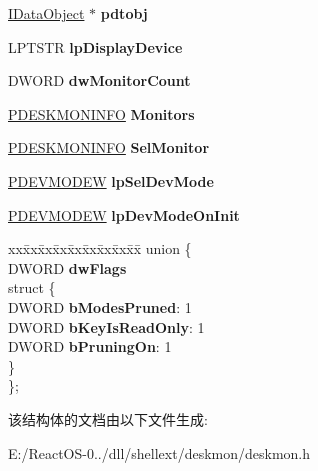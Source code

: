 \begin{DoxyCompactItemize}
\hyperlink{interface_i_data_object}{I\+Data\+Object} $\ast$ {\bfseries pdtobj}
\item 
\mbox{\label{struct___d_e_s_k_m_o_n_i_t_o_r_ae4b5e58c3bed99aaa9cb3c3f856f3486}} 
L\+P\+T\+S\+TR {\bfseries lp\+Display\+Device}
\item 
\mbox{\label{struct___d_e_s_k_m_o_n_i_t_o_r_a21f927b2302b7c29a535423757892896}} 
D\+W\+O\+RD {\bfseries dw\+Monitor\+Count}
\item 
\mbox{\label{struct___d_e_s_k_m_o_n_i_t_o_r_af65575cbbe2e60acb41b317016c3d233}} 
\hyperlink{struct___d_e_s_k_m_o_n_i_n_f_o}{P\+D\+E\+S\+K\+M\+O\+N\+I\+N\+FO} {\bfseries Monitors}
\item 
\mbox{\label{struct___d_e_s_k_m_o_n_i_t_o_r_ae8d87d37e398430637de47681668fd75}} 
\hyperlink{struct___d_e_s_k_m_o_n_i_n_f_o}{P\+D\+E\+S\+K\+M\+O\+N\+I\+N\+FO} {\bfseries Sel\+Monitor}
\item 
\mbox{\label{struct___d_e_s_k_m_o_n_i_t_o_r_a10a4389312468fa26275b9512670b03d}} 
\hyperlink{struct__devicemode_w}{P\+D\+E\+V\+M\+O\+D\+EW} {\bfseries lp\+Sel\+Dev\+Mode}
\item 
\mbox{\label{struct___d_e_s_k_m_o_n_i_t_o_r_a472efe9a93103adf1865d07a88f703db}} 
\hyperlink{struct__devicemode_w}{P\+D\+E\+V\+M\+O\+D\+EW} {\bfseries lp\+Dev\+Mode\+On\+Init}
\item 
\mbox{\label{struct___d_e_s_k_m_o_n_i_t_o_r_ae3f3f282b00ae549b1a505c551989a4a}} 
\begin{tabbing}
xx\=xx\=xx\=xx\=xx\=xx\=xx\=xx\=xx\=\kill
union \{\\
\>DWORD {\bfseries dwFlags}\\
\mbox{\label{union___d_e_s_k_m_o_n_i_t_o_r_1_1_0D280_aea206192d03b5a76c15ea3e0b64ed334}} 
\>struct \{\\
\>\>DWORD {\bfseries bModesPruned}: 1\\
\>\>DWORD {\bfseries bKeyIsReadOnly}: 1\\
\>\>DWORD {\bfseries bPruningOn}: 1\\
\>\} \\
\}; \\

\end{tabbing}\end{DoxyCompactItemize}


该结构体的文档由以下文件生成\+:\begin{DoxyCompactItemize}
\item 
E\+:/\+React\+O\+S-\/0../dll/shellext/deskmon/deskmon.\+h\end{DoxyCompactItemize}
